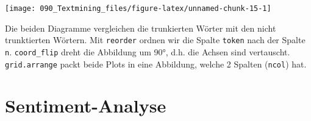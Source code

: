 \documentclass[12pt,]{book}
\newenvironment{Shaded}{\begin{snugshade}}{\end{snugshade}}
\newcommand{\KeywordTok}[1]{\textcolor[rgb]{0.13,0.29,0.53}{\textbf{{#1}}}}
\newcommand{\DataTypeTok}[1]{\textcolor[rgb]{0.13,0.29,0.53}{{#1}}}
\newcommand{\DecValTok}[1]{\textcolor[rgb]{0.00,0.00,0.81}{{#1}}}
\newcommand{\StringTok}[1]{\textcolor[rgb]{0.31,0.60,0.02}{{#1}}}
\newcommand{\OtherTok}[1]{\textcolor[rgb]{0.56,0.35,0.01}{{#1}}}
\newcommand{\NormalTok}[1]{{#1}}
\begin{document}
\begin{Shaded}
\end{Shaded}

\begin{center}\texttt{[image: 090\_Textmining\_files/figure-latex/unnamed-chunk-15-1]} \end{center}

Die beiden Diagramme vergleichen die trunkierten Wörter mit den nicht
trunktierten Wörtern. Mit \texttt{reorder} ordnen wir die Spalte
\texttt{token} nach der Spalte \texttt{n}. \texttt{coord\_flip} dreht
die Abbildung um 90°, d.h. die Achsen sind vertauscht.
\texttt{grid.arrange} packt beide Plots in eine Abbildung, welche 2
Spalten (\texttt{ncol}) hat.

\section{Sentiment-Analyse}\label{sentiment-analyse}
\end{document}
